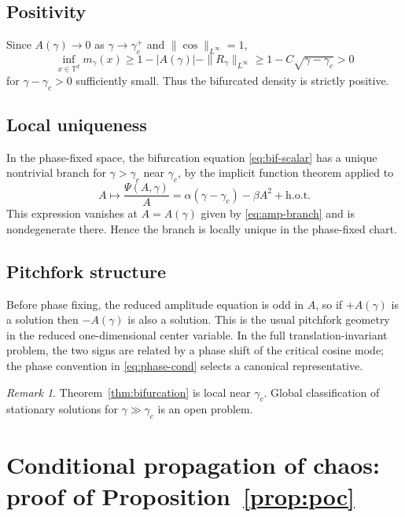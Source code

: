 \documentclass[11pt]{amsart}
\theoremstyle{definition}
\theoremstyle{remark}
\newtheorem{remark}[theorem]{Remark}
\newcommand{\Td}{\mathbb{T}^d}
\newcommand{\gamc}{\gamma_c}
\begin{document}
\subsection{Positivity}
\label{sub:positivity}

Since $A(\gamma)\to 0$ as $\gamma\to\gamc^+$ and $\|\cos\|_{L^\infty}=1$,
\[
\inf_{x\in\Td}m_\gamma(x)\ge 1-|A(\gamma)|-\|R_\gamma\|_{L^\infty}
\ge 1-C\sqrt{\gamma-\gamc}>0
\]
for $\gamma-\gamc>0$ sufficiently small. Thus the bifurcated density is strictly positive.

\subsection{Local uniqueness}
\label{sub:uniqueness}

In the phase-fixed space, the bifurcation equation \eqref{eq:bif-scalar} has a unique nontrivial branch for $\gamma>\gamc$ near $\gamc$, by the implicit function theorem applied to
\[
A\mapsto \frac{\Psi(A,\gamma)}{A}
=
\alpha(\gamma-\gamc)-\beta A^2+\text{h.o.t.}
\]
This expression vanishes at $A=A(\gamma)$ given by \eqref{eq:amp-branch} and is nondegenerate there. Hence the branch is locally unique in the phase-fixed chart.

\subsection{Pitchfork structure}
\label{sub:pitchfork}

Before phase fixing, the reduced amplitude equation is odd in $A$, so if $+A(\gamma)$ is a solution then $-A(\gamma)$ is also a solution. This is the usual pitchfork geometry in the reduced one-dimensional center variable. In the full translation-invariant problem, the two signs are related by a phase shift of the critical cosine mode; the phase convention in \eqref{eq:phase-cond} selects a canonical representative.

\begin{remark}
Theorem~\ref{thm:bifurcation} is local near $\gamc$. Global classification of stationary solutions for $\gamma\gg\gamc$ is an open problem.
\end{remark}

\section{Conditional propagation of chaos: proof of Proposition~\ref{prop:poc}}
\label{sec:poc-proof}
\end{document}
